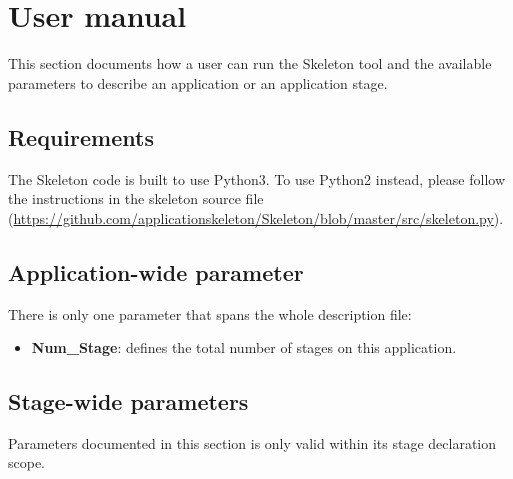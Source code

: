 \documentclass[10pt,a4paper]{article}
\begin{document}
\section{User manual}

This section documents how a user can run the Skeleton tool and the available parameters to describe an application or an application stage.

\subsection{Requirements}

The Skeleton code is built to use Python3.  To use Python2 instead, please follow the instructions in the skeleton source file (\url{https://github.com/applicationskeleton/Skeleton/blob/master/src/skeleton.py}). 

\subsection{Application-wide parameter}

There is only one parameter that spans the whole description file:

\begin{itemize}

\item{\textbf{Num\_Stage}:} defines the total number of stages on this application.

\end{itemize}

\subsection{Stage-wide parameters}\label{sec:stage-wide}

Parameters documented in this section is only valid within its stage declaration scope.
\end{document}
